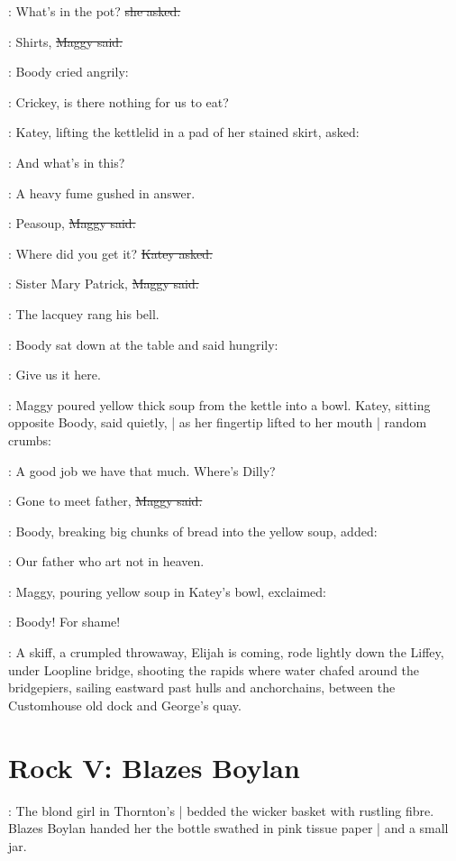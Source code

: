 \katey:
What's in the pot?
\sout{she asked.}

\maggy:
Shirts,
\sout{Maggy said.}

:
Boody cried angrily:

\boody:
Crickey, is there nothing for us to eat?

:
Katey,
lifting the kettlelid in a pad of her stained skirt,
asked:

\katey:
And what's in this?

:
A heavy fume gushed in answer.

\maggy:
Peasoup,
\sout{Maggy said.}

\katey:
Where did you get it?
\sout{Katey asked.}

\maggy:
Sister Mary Patrick,
\sout{Maggy said.}

:
The lacquey rang his bell.


:
Boody sat down at the table and said hungrily:

\boody:
Give us it here.

:
Maggy poured yellow thick soup from the kettle into a bowl.
Katey,
sitting opposite Boody,
said quietly, |
as her fingertip lifted to her mouth |
random crumbs:

\katey:
A good job we have that much.
Where's Dilly?

\maggy:
Gone to meet father,
\sout{Maggy said.}

:
Boody,
breaking big chunks of bread into the yellow soup,
added:

\boody:
Our father who art not in heaven.

:
Maggy,
pouring yellow soup in Katey's bowl,
exclaimed:

\maggy:
Boody!
For shame!

\begin{interject}
    :
    A skiff,
    a crumpled throwaway,
    Elijah is coming,
    rode lightly down the Liffey,
    under Loopline bridge,
    shooting the rapids where water chafed around the bridgepiers,
    sailing eastward past hulls and anchorchains,
    between the Customhouse old dock and George's quay.
\end{interject}


\section*{Rock V: Blazes Boylan}

:
The blond girl in Thornton's |
bedded the wicker basket with rustling fibre.
Blazes Boylan handed her the bottle swathed in pink tissue paper |
and a small jar.

